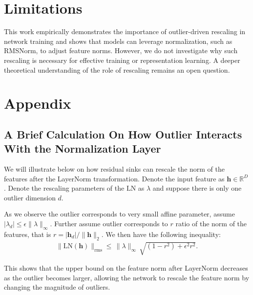 \documentclass{article} %
\begin{document}
\section*{Limitations}

This work empirically demonstrates the importance of outlier-driven rescaling in network training and shows that models can leverage normalization, such as RMSNorm, to adjust feature norms. 
However, we do not investigate why such rescaling is necessary for effective training or representation learning. A deeper theoretical understanding of the role of rescaling remains an open question.




\appendix

\section{Appendix}

\subsection{A Brief Calculation On How Outlier Interacts With the Normalization Layer}
\label{proof}

We will illustrate below on how residual sinks can rescale the norm of the features after the LayerNorm transformation. 
Denote the input feature as $\mathbf{h} \in \mathbb{R}^D$. 
Denote the rescaling parameters of the $\mathrm{LN}$ as $\lambda$ and suppose there is only one outlier dimension $d$.

As we observe the outlier corresponds to very small affine parameter, assume $|\lambda_d| \le \epsilon \lVert \lambda \rVert_{\infty}$. Further assume outlier corresponds to $r$ ratio of the norm of the features, that is $r = |\mathbf{h}_d| / \lVert \mathbf{h} \rVert_2$. We then have the following inequality: 
\begin{align}
\lVert \mathrm{LN}(\mathbf{h}) \rVert_{\mathrm{rms}}
\le \,\lVert \lambda \rVert_\infty\,\sqrt{(1-r^2)+\epsilon^2 r^2}.
\end{align}

This shows that the upper bound on the feature norm after LayerNorm decreases as the outlier becomes larger, allowing the network to rescale the feature norm by changing the magnitude of outliers.
\end{document}
